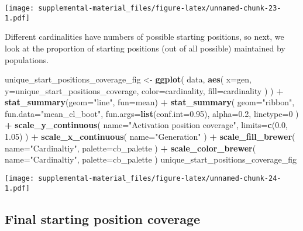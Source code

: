 \documentclass[]{book}
\newenvironment{Shaded}{\begin{snugshade}}{\end{snugshade}}
\newcommand{\DataTypeTok}[1]{\textcolor[rgb]{0.13,0.29,0.53}{#1}}
\newcommand{\DecValTok}[1]{\textcolor[rgb]{0.00,0.00,0.81}{#1}}
\newcommand{\FloatTok}[1]{\textcolor[rgb]{0.00,0.00,0.81}{#1}}
\newcommand{\KeywordTok}[1]{\textcolor[rgb]{0.13,0.29,0.53}{\textbf{#1}}}
\newcommand{\NormalTok}[1]{#1}
\newcommand{\OperatorTok}[1]{\textcolor[rgb]{0.81,0.36,0.00}{\textbf{#1}}}
\newcommand{\StringTok}[1]{\textcolor[rgb]{0.31,0.60,0.02}{#1}}
\begin{document}
\texttt{[image: supplemental-material\_files/figure-latex/unnamed-chunk-23-1.pdf]}

Different cardinalities have numbers of possible starting positions, so next, we look at the proportion of starting positions (out of all possible) maintained by populations.

\begin{Shaded}
\begin{Highlighting}[]
\NormalTok{unique_start_positions_coverage_fig <-}\StringTok{ }\KeywordTok{ggplot}\NormalTok{(}
\NormalTok{    data,}
    \KeywordTok{aes}\NormalTok{(}
      \DataTypeTok{x=}\NormalTok{gen,}
      \DataTypeTok{y=}\NormalTok{unique_start_positions_coverage,}
      \DataTypeTok{color=}\NormalTok{cardinality,}
      \DataTypeTok{fill=}\NormalTok{cardinality}
\NormalTok{    )}
\NormalTok{  ) }\OperatorTok{+}
\StringTok{  }\KeywordTok{stat_summary}\NormalTok{(}\DataTypeTok{geom=}\StringTok{"line"}\NormalTok{, }\DataTypeTok{fun=}\NormalTok{mean) }\OperatorTok{+}
\StringTok{  }\KeywordTok{stat_summary}\NormalTok{(}
    \DataTypeTok{geom=}\StringTok{"ribbon"}\NormalTok{,}
    \DataTypeTok{fun.data=}\StringTok{"mean_cl_boot"}\NormalTok{,}
    \DataTypeTok{fun.args=}\KeywordTok{list}\NormalTok{(}\DataTypeTok{conf.int=}\FloatTok{0.95}\NormalTok{),}
    \DataTypeTok{alpha=}\FloatTok{0.2}\NormalTok{,}
    \DataTypeTok{linetype=}\DecValTok{0}
\NormalTok{  ) }\OperatorTok{+}
\StringTok{  }\KeywordTok{scale_y_continuous}\NormalTok{(}
    \DataTypeTok{name=}\StringTok{"Activation position coverage"}\NormalTok{,}
    \DataTypeTok{limits=}\KeywordTok{c}\NormalTok{(}\FloatTok{0.0}\NormalTok{, }\FloatTok{1.05}\NormalTok{)}
\NormalTok{  ) }\OperatorTok{+}
\StringTok{  }\KeywordTok{scale_x_continuous}\NormalTok{(}
    \DataTypeTok{name=}\StringTok{"Generation"}
\NormalTok{  ) }\OperatorTok{+}
\StringTok{  }\KeywordTok{scale_fill_brewer}\NormalTok{(}
    \DataTypeTok{name=}\StringTok{"Cardinaltiy"}\NormalTok{,}
    \DataTypeTok{palette=}\NormalTok{cb_palette}
\NormalTok{  ) }\OperatorTok{+}
\StringTok{  }\KeywordTok{scale_color_brewer}\NormalTok{(}
    \DataTypeTok{name=}\StringTok{"Cardinaltiy"}\NormalTok{,}
    \DataTypeTok{palette=}\NormalTok{cb_palette}
\NormalTok{  )}
\NormalTok{unique_start_positions_coverage_fig}
\end{Highlighting}
\end{Shaded}

\texttt{[image: supplemental-material\_files/figure-latex/unnamed-chunk-24-1.pdf]}

\hypertarget{final-starting-position-coverage-1}{%
\subsection{Final starting position coverage}\label{final-starting-position-coverage-1}}
\end{document}
